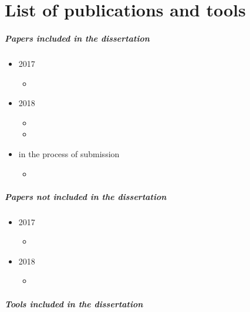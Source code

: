 \chapter*{List of publications and tools}

\paragraph{Papers included in the dissertation}

\begin{itemize}
	\item 2017
	\begin{itemize}
		\item {}
	\end{itemize}
	\item 2018
	\begin{itemize}
		\item {}
		\item {}
	\end{itemize}
	\item in the process of submission
	\begin{itemize}
		\item {}
	\end{itemize}
\end{itemize}

\paragraph{Papers not included in the dissertation}

\begin{itemize}
	\item 2017
	\begin{itemize}
		\item {}
	\end{itemize}
	\item 2018
	\begin{itemize}
		\item {}
	\end{itemize}
\end{itemize}

\paragraph{Tools included in the dissertation}


